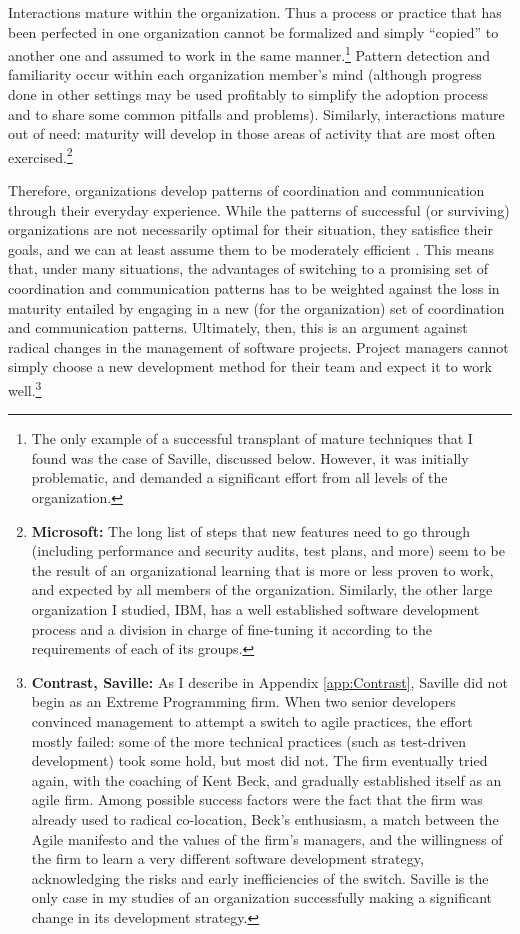Interactions mature within the organization. Thus a process or practice that has been perfected in one organization cannot be formalized and simply ``copied'' to another one and assumed to work in the same manner.\footnote{The only example of a successful transplant of mature techniques that I found was the case of Saville, discussed below. However, it was initially problematic, and demanded a significant effort from all levels of the organization.} Pattern detection and familiarity occur within each organization member's mind (although progress done in other settings may be used profitably to simplify the adoption process and to share some common pitfalls and problems). Similarly, interactions mature out of need: maturity will develop in those areas of activity that are most often exercised.\footnote{\textbf{Microsoft:} The long list of steps that new features need to go through (including performance and security audits, test plans, and more) seem to be the result of an organizational learning that is more or less proven to work, and expected by all members of the organization. Similarly, the other large organization I studied, IBM, has a well established software development process and a division in charge of fine-tuning it according to the requirements of each of its groups.}

Therefore, organizations develop patterns of coordination and communication through their everyday experience. While the patterns of successful (or surviving) organizations are not necessarily optimal for their situation, they satisfice their goals, and we can at least assume them to be moderately efficient \cite{Aranda2007}. This means that, under many situations, the advantages of switching to a promising set of coordination and communication patterns has to be weighted against the loss in maturity entailed by engaging in a new (for the organization) set of coordination and communication patterns. Ultimately, then, this is an argument against radical changes in the management of software projects. Project managers cannot simply choose a new development method for their team and expect it to work well.\footnote{\textbf{Contrast, Saville:} As I describe in Appendix \ref{app:Contrast}, Saville did not begin as an Extreme Programming firm. When two senior developers convinced management to attempt a switch to agile practices, the effort mostly failed: some of the more technical practices (such as test-driven development) took some hold, but most did not. The firm eventually tried again, with the coaching of Kent Beck, and gradually established itself as an agile firm. Among possible success factors were the fact that the firm was already used to radical co-location, Beck's enthusiasm, a match between the Agile manifesto and the values of the firm's managers, and the willingness of the firm to learn a very different software development strategy, acknowledging the risks and early inefficiencies of the switch. Saville is the only case in my studies of an organization successfully making a significant change in its development strategy.}

